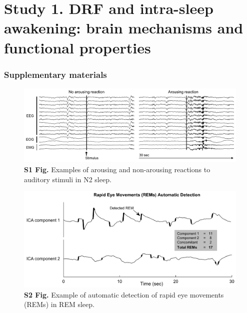 \cleardoublepage

\chapter{Study 1. DRF and intra-sleep awakening: brain mechanisms and functional properties}
\label{res:arousal}

\cleardoublepage



\cleardoublepage

\subsection*{Supplementary materials}
\label{res:arousal:supp}
\vspace*{1cm}

\begin{figure}[htbp]
	\includegraphics[width=\textwidth]{Fig/Results/Arousals/S1_Fig.png}
	\caption*{\textbf{S1 Fig.} Examples of arousing and non-arousing reactions to auditory stimuli in N2 sleep.}
\end{figure}

\vspace*{3cm}

\begin{figure}[htbp]
	\includegraphics[width=\textwidth]{Fig/Results/Arousals/S2_Fig.png}
	\caption*{\textbf{S2 Fig.} Example of automatic detection of rapid eye movements (REMs) in REM sleep. }
\end{figure}

